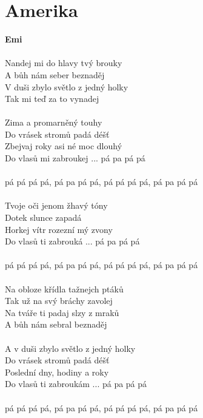 \section{Amerika}
\footnotesize\textbf{Emi}\\
\normalsize
\\
Nandej mi do hlavy tvý brouky\\
A bůh nám seber beznaděj\\
V duši zbylo světlo z jedný holky\\
Tak mi teď za to vynadej\\
\\
Zima a promarněný touhy\\
Do vrásek stromů padá déšť\\
Zbejvaj roky asi né moc dlouhý\\
Do vlasů mi zabroukej ... pá pa pá pá\\
\\
pá pá pá pá, pá pa pá pá, pá pá pá pá, pá pa pá pá\\
\\
Tvoje oči jenom žhavý tóny\\
Dotek slunce zapadá\\
Horkej vítr rozezní mý zvony\\
Do vlasů ti zabrouká ... pá pa pá pá\\
\\
pá pá pá pá, pá pa pá pá, pá pá pá pá, pá pa pá pá\\
\\
Na obloze křídla tažnejch ptáků\\
Tak už na svý bráchy zavolej\\
Na tváře ti padaj slzy z mraků\\
A bůh nám sebral beznaděj\\
\\
A v duši zbylo světlo z jedný holky\\
Do vrásek stromů padá déšť\\
Poslední dny, hodiny a roky\\
Do vlasů ti zabroukám ... pá pa pá pá\\
\\
pá pá pá pá, pá pa pá pá, pá pá pá pá, pá pa pá pá\\